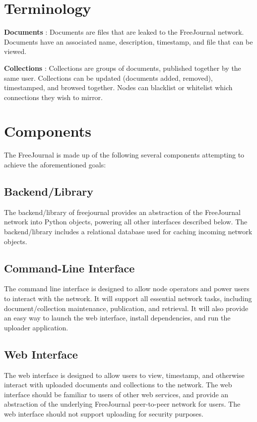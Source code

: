 \documentclass[letterpaper,10pt,oneside]{sphinxmanual}
\begin{document}
\section{Terminology}
\label{design:terminology}
\textbf{Documents} : Documents are files that are leaked to the FreeJournal network.  Documents have an associated name, description,
timestamp, and file that can be viewed.

\textbf{Collections} : Collections are groups of documents, published together by the same user.  Collections can be updated (documents
added, removed), timestamped, and browsed together.  Nodes can blacklist or whitelist which connections they wish to mirror.


\section{Components}
\label{design:components}
The FreeJournal is made up of the following several components attempting to achieve the aforementioned goals:


\subsection{Backend/Library}
\label{design:backend-library}
The backend/library of freejournal provides an abstraction of the FreeJournal network into Python objects, powering all other
interfaces described below.  The backend/library includes a relational database used for caching incoming network objects.


\subsection{Command-Line Interface}
\label{design:command-line-interface}
The command line interface is designed to allow node operators and power users to interact with the network.  It will support
all essential network tasks, including document/collection maintenance, publication, and retrieval.  It will also provide an
easy way to launch the web interface, install dependencies, and run the uploader application.


\subsection{Web Interface}
\label{design:web-interface}
The web interface is designed to allow users to view, timestamp, and otherwise interact with uploaded documents and collections
to the network.  The web interface should be familiar to users of other web services, and provide an abstraction of the underlying
FreeJournal peer-to-peer network for users.  The web interface should not support uploading for security purposes.
\end{document}
